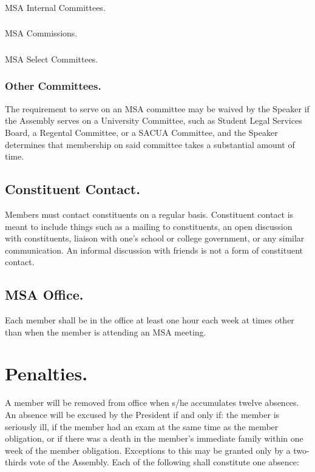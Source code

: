 \documentclass{rules}
\begin{document}
\subsubsection{}
MSA Internal Committees.
\subsubsection{}
MSA Commissions.
\subsubsection{}
MSA Select Committees.
\subsubsection{Other Committees.}
The requirement to serve on an MSA committee may be waived by the Speaker if the Assembly serves on a University Committee, such as Student Legal Services Board, a Regental Committee, or a SACUA Committee, and the Speaker determines that membership on said committee takes a substantial amount of time.
\subsection{Constituent Contact.}
Members must contact constituents on a regular basis. Constituent contact is meant to include things such as a mailing to constituents, an open discussion with constituents, liaison with one's school or college government, or any similar communication. An informal discussion with friends is not a form of constituent contact.
\subsection{MSA Office.}
Each member shall be in the office at least one hour each week at times other than when the member is attending an MSA meeting.

\section{Penalties.}
A member will be removed from office when s/he accumulates twelve absences. An absence will be excused by the President if and only if: the member is seriously ill, if the member had an exam at the same time as the member obligation, or if there was a death in the member's immediate family within one week of the member obligation. Exceptions to this may be granted only by a two-thirds vote of the Assembly. Each of the following shall constitute one absence:
\end{document}
